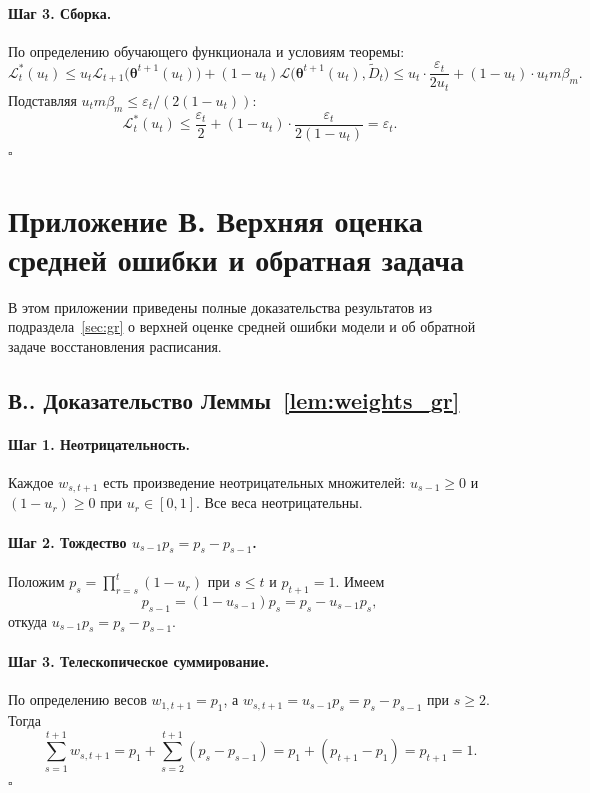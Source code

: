 \documentclass[a4paper,14pt,oneside,openany]{extarticle}
\newcommand{\cL}{\mathcal{L}}
\newcommand{\btheta}{\boldsymbol{\theta}}
\begin{document}
\paragraph{Шаг 3. Сборка.} По определению обучающего функционала и условиям теоремы:
\[
    \cL^*_t(u_t) \le u_t \cL_{t+1}\bigl(\btheta^{t+1}(u_t)\bigr) + (1 - u_t) \cL\bigl(\btheta^{t+1}(u_t), \widetilde D_t\bigr) \le u_t \cdot \frac{\varepsilon_t}{2 u_t} + (1 - u_t) \cdot u_t m \beta_m.
\]
Подставляя $u_t m \beta_m \le \varepsilon_t / (2(1 - u_t))$:
\[
    \cL^*_t(u_t) \le \frac{\varepsilon_t}{2} + (1 - u_t) \cdot \frac{\varepsilon_t}{2(1 - u_t)} = \varepsilon_t.
\]
\hfill$\square$

\newpage
\cleardoublepage
{}
{}
\section*{Приложение В. Верхняя оценка средней ошибки и обратная задача}

В этом приложении приведены полные доказательства результатов из подраздела~\ref{sec:gr} о верхней оценке средней ошибки модели и об обратной задаче восстановления расписания.

\setcounter{appthm}{0}
\renewcommand{\theappthm}{В.}

\subsection*{\theappthm. Доказательство Леммы~\ref{lem:weights_gr}}\label{app:proof_weights}

\paragraph{Шаг 1. Неотрицательность.} Каждое $w_{s, t+1}$ есть произведение неотрицательных множителей: $u_{s-1} \ge 0$ и $(1 - u_r) \ge 0$ при $u_r \in [0, 1]$. Все веса неотрицательны.

\paragraph{Шаг 2. Тождество $u_{s-1} p_s = p_s - p_{s-1}$.} Положим $p_s = \prod_{r=s}^{t}(1 - u_r)$ при $s \le t$ и $p_{t+1} = 1$. Имеем
\[
    p_{s-1} = (1 - u_{s-1}) p_s = p_s - u_{s-1} p_s,
\]
откуда $u_{s-1} p_s = p_s - p_{s-1}$.

\paragraph{Шаг 3. Телескопическое суммирование.} По определению весов $w_{1, t+1} = p_1$, а $w_{s, t+1} = u_{s-1} p_s = p_s - p_{s-1}$ при $s \ge 2$. Тогда
\[
    \sum_{s=1}^{t+1} w_{s, t+1} = p_1 + \sum_{s=2}^{t+1}(p_s - p_{s-1}) = p_1 + (p_{t+1} - p_1) = p_{t+1} = 1.
\]
\hfill$\square$
\end{document}
